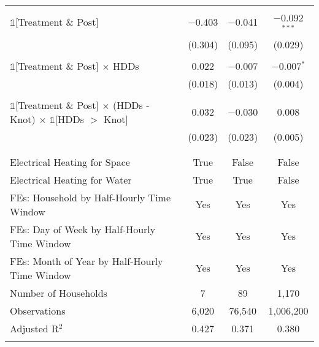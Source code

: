 \begin{table}[!htbp]
\begin{tabular}{@{\extracolsep{20pt}}lccc}
  & & & \\ 
 $\mathbb{1}$[Treatment \& Post] & $-$0.403 & $-$0.041 & $-$0.092$^{***}$ \\ 
  & (0.304) & (0.095) & (0.029) \\ 
  & & & \\ 
 $\mathbb{1}$[Treatment \& Post] $\times$ HDDs & 0.022 & $-$0.007 & $-$0.007$^{*}$ \\ 
  & (0.018) & (0.013) & (0.004) \\ 
  & & & \\ 
 $\mathbb{1}$[Treatment \& Post] $\times$ (HDDs - Knot) $\times$ $\mathbb{1}$[HDDs $>$ Knot] & 0.032 & $-$0.030 & 0.008 \\ 
  & (0.023) & (0.023) & (0.005) \\ 
  & & & \\ 
\hline \\[-1.8ex] 
Electrical Heating for Space & True & False & False \\ 
Electrical Heating for Water & True & True & False \\ 
FEs: Household by Half-Hourly Time Window & Yes & Yes & Yes \\ 
FEs: Day of Week by Half-Hourly Time Window & Yes & Yes & Yes \\ 
FEs: Month of Year by Half-Hourly Time Window & Yes & Yes & Yes \\ 
Number of Households &     7 &    89 & 1,170 \\ 
Observations & 6,020 & 76,540 & 1,006,200 \\ 
Adjusted R$^{2}$ & 0.427 & 0.371 & 0.380 \\ 
\hline 
\hline \\[-1.8ex] 
\end{tabular} 
\end{table} 

